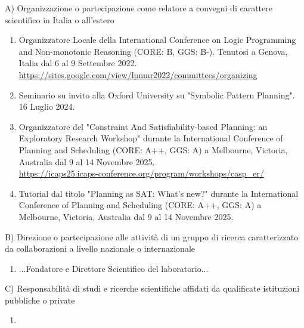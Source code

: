 \documentclass{resume} %
\begin{document}

\begin{rSectionLower}{A) Organizzazione o partecipazione come relatore a convegni di carattere scientifico in Italia o all'estero}
	\begin{enumerate}
		\item Organizzatore Locale della International Conference on Logic Programming and Non-monotonic Reasoning (CORE: B, GGS: B-). Tenutosi a Genova, Italia dal 6 al 9 Settembre 2022. \\\url{https://sites.google.com/view/lpnmr2022/committees/organizing}
		\item Seminario su invito alla Oxford University su "Symbolic Pattern Planning". 16 Luglio 2024.
		\item Organizzatore del "Constraint And Satisfiability-based Planning: an Exploratory Research Workshop" durante la International Conference of Planning and Scheduling (CORE: A++, GGS: A) a Melbourne, Victoria, Australia dal 9 al 14 Novembre 2025. \\\url{https://icaps25.icaps-conference.org/program/workshops/casp_er/}
		\item Tutorial dal titolo "Planning as SAT: What’s new?" durante la International Conference of Planning and Scheduling (CORE: A++, GGS: A) a Melbourne, Victoria, Australia dal 9 al 14 Novembre 2025.
	\end{enumerate}
\end{rSectionLower}

\begin{rSectionLower}{B) Direzione o partecipazione alle attività di un gruppo di ricerca caratterizzato da collaborazioni a livello nazionale o internazionale}
	\begin{enumerate}
		\item ...Fondatore e Direttore Scientifico del laboratorio...
	\end{enumerate}
\end{rSectionLower}

\begin{rSectionLower}{C) Responsabilità di studi e ricerche scientifiche affidati da qualificate istituzioni pubbliche o private}
	\begin{enumerate}
		\item 
	\end{enumerate}
\end{rSectionLower}
\end{document}
